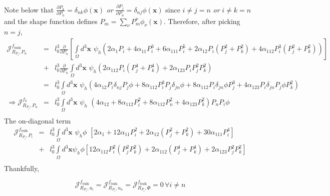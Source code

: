 \documentclass[16pt]{article} %
\begin{document}
Note below that $\frac{\partial P_k}{\partial P_n} = \delta_{nk} \phi ({\boldsymbol x})$ \textit{or} $\frac{\partial P_j}{\partial P_n} = \delta_{nj} \phi ({\boldsymbol x})$ since $i \neq j =n$ \textit{or} $i \neq k = n$ and the shape function defines $P_m = \sum_\nu P_m^\nu \phi_\nu ({\boldsymbol x})$.
Therefore, after picking $n = j$, 
%
\begin{eqnarray}\nonumber
\mathscr{J}_{R_{P_i}, P_n}^{f_\mathrm{bulk}} &=&l_0^3  \frac{\partial }{\partial P_n} \left[\int\limits_\Omega d^3   {\boldsymbol x}\,\,\psi_h \left(2 \alpha_1 P_i + 4 \alpha_{11} P_i^3 + 6 \alpha_{111} P_i^5 + 2 \alpha_{12} P_i \left(P_j^2 + P_k^2 \right) + 4 \alpha_{112} P_i^3 \left(P_j^2 + P_k^2 \right)  \right) \right]\\ \nonumber
&+&l_0^3 \frac{\partial}{\partial P_n}  \int\limits_\Omega d^3 {\boldsymbol x}\,\,\psi_h  \left(2 \alpha_{112} P_i \left(P_j^4 + P_k^4 \right) + 2 \alpha_{123} P_i P_j^2 P_k^2  \right)\\ \nonumber
&=& l_0^3 \int\limits_\Omega d^3 {\boldsymbol x}\,\, \psi_h \left(4 \alpha_{12} P_i \delta_{nj} P_j \phi  + 8 \alpha_{112} P_i^3 P_j \delta_{jn} \phi + 8 \alpha_{112} P_i \delta_{jn} \phi P_j^3 + 4 \alpha_{123} P_i \delta_{jn} P_j \phi P_k^2\right)\\ \nonumber
\Rightarrow \mathscr{J}_{R_{P_i}, P_n}^{f_b} &=& l_0^3 \int\limits_\Omega d^3 {\boldsymbol x}\,\, \psi_h \,\, \left( 4 \alpha_{12} + 8 \alpha_{112} P_i^2 + 8 \alpha_{112} P_n^2 + 4 \alpha_{123} P_k^2\right) P_n P_i \phi \\ \nonumber
\end{eqnarray}
The on-diagonal term 
\begin{eqnarray}\nonumber
\mathscr{J}_{R_{P_i}, P_i}^{f_\mathrm{bulk}} &=&l_0^3 \int\limits_\Omega d^3 {\boldsymbol x} \,\, \psi_h \phi \,\, \left[2 \alpha_1  + 12 \alpha_{11} P_i^2 + 2 \alpha_{12} \left(P_j^2 + P_k^2 \right) + 30 \alpha_{111} P_i^4 \right] \\ \nonumber
&+&l_0^3\int\limits_\Omega d^3 {\boldsymbol x} \psi_h \phi  \left[ 12 \alpha_{112} P_i^2 \left(P_j^2 P_k^2 \right) + 2 \alpha_{112} \left(P_j^4 + P_k^4 \right) + 2 \alpha_{123} P_j^2 P_k^2 \right]\\ \nonumber
\end{eqnarray}
Thankfully, 

$$\mathscr{J}_{R_{P_i} , u_i}^{f_\mathrm{bulk}} = \mathscr{J}_{R_{P_i} , u_n}^{f_\mathrm{bulk}} = \mathscr{J}_{R_{P_i} , \Phi}^{f_\mathrm{bulk}} = 0 \,\forall i \neq n $$
%
\newpage
%
\end{document}
